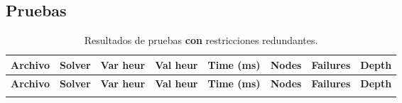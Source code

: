 
\subsection{Pruebas}\label{sec:01-jobshop_mantenimiento-pruebas}

\small

\begin{longtable}{l l l l r r r r}
    \caption{Resultados de pruebas \textbf{con} restricciones redundantes.}\label{tab:pruebas-jobshop_mantenimiento-on}                                   \\
    \toprule
    \textbf{Archivo} & \textbf{Solver} & \textbf{Var heur} & \textbf{Val heur} & \textbf{Time (ms)} & \textbf{Nodes} & \textbf{Failures} & \textbf{Depth} \\
    \midrule
    \endfirsthead
    \toprule
    \textbf{Archivo} & \textbf{Solver} & \textbf{Var heur} & \textbf{Val heur} & \textbf{Time (ms)} & \textbf{Nodes} & \textbf{Failures} & \textbf{Depth} \\
    \midrule
    \endhead
    \bottomrule
    \endlastfoot


\end{longtable}
